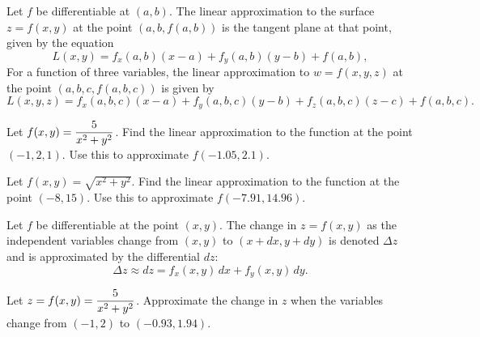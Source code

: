 \documentclass[mathNotesPreamble]{subfiles}
\begin{document}
  \begin{defn*}
    Let $f$ be differentiable at $(a,b)$. The linear approximation to the surface $z=f(x,y)$ at the point $(a,b,f(a,b))$ is the tangent plane at that point, given by the equation
      \[L(x,y)=f_x(a,b)(x-a)+f_y(a,b)(y-b)+f(a,b),\]
    For a function of three variables, the linear approximation to $w=f(x,y,z)$ at the point $(a,b,c,f(a,b,c))$ is given by
      \[L(x,y,z)=f_x(a,b,c)(x-a)+f_y(a,b,c)(y-b)+f_z(a,b,c)(z-c)+f(a,b,c).\]
  \end{defn*}
  \pagebreak

  \begin{ex*}
    Let $f(x,y)=\displaystyle\frac{5}{x^2+y^2}$. Find the linear approximation to the function at the point $(-1,2,1)$. Use this to approximate $f(-1.05, 2.1)$.
  \end{ex*}
  
  \begin{ex*}
    Let $f(x,y)=\sqrt{x^2+y^2}$. Find the linear approximation to the function at the point $(-8,15)$. Use this to approximate $f(-7.91, 14.96)$.
  \end{ex*}
  \pagebreak

  \begin{defn*}
    Let $f$ be differentiable at the point $(x,y)$. The change in $z=f(x,y)$ as the independent variables change from $(x,y)$ to $(x+dx, y+dy)$ is denoted $\Delta z$ and is approximated by the differential $dz$:
      \[\Delta z\approx dz= f_x(x,y)\,dx+f_y(x,y)\,dy.\]
  \end{defn*}

  \begin{ex*}
    Let $z=f(x,y)=\displaystyle\frac{5}{x^2+y^2}$. Approximate the change in $z$ when the variables change from $(-1,2)$ to $(-0.93, 1.94)$.
  \end{ex*}
  \pagebreak
\end{document}
